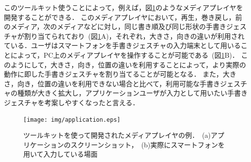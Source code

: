 このツールキット使うことによって，例えば，図\ref{fig:application}のようなメディアプレイヤを開発することができる．
このメディアプレイヤにおいて，再生，巻き戻し，前のメディア，次のメディアなどに対し，同じ書き順及び同じ形状の手書きジェスチャが割り当てられており~(図\ref{fig:application}A)，それぞれ，大きさ，向きの違いが利用されている．ユーザはスマートフォンを手書きジェスチャの入力端末として用いることによって，PC上のメディアプレイヤを操作することが可能である~(図\ref{fig:application}B)．
このようにして，大きさ，向き，位置の違いを利用することによって，より実際の動作に即した手書きジェスチャを割り当てることが可能となる．
また，大きさ，向き，位置の違いを利用できない場合と比べて，利用可能な手書きジェスチャの種類が大きく拡大し，アプリケーションユーザが入力として用いたい手書きジェスチャを考案しやすくなったと言える．

\begin{figure} [h!]
	\begin{center}
		\texttt{[image: img/application.eps]}
	\end{center}
	\caption{ツールキットを使って開発されたメディアプレイヤの例．~(a)アプリケーションのスクリーンショット，~(b)実際にスマートフォンを用いて入力している場面}
	\label{fig:application}
\end{figure}
